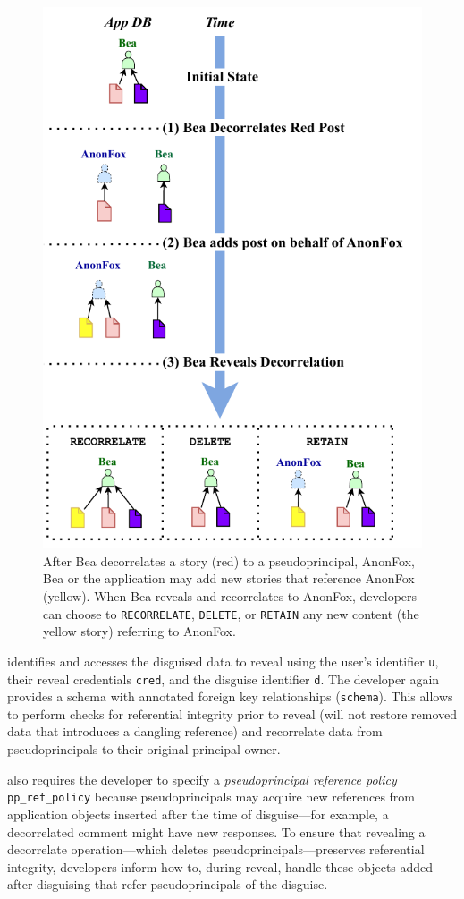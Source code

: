 \begin{figure}
    \centering
    \includegraphics[width=.7\textwidth]{figs/ppreveal_policies}
    \caption[\texttt{RECORRELATE}, \texttt{DELETE}, and
    \texttt{RETAIN} policies maintain referential integrity for objects added
    after disguising that refer to a pseudoprincipal during reveal.]{After Bea
    decorrelates a story (red) to a pseudoprincipal, AnonFox, Bea or the
    application may add new stories that reference AnonFox (yellow). When Bea
    reveals and recorrelates to AnonFox, developers can
    choose to \texttt{RECORRELATE}, \texttt{DELETE}, or \texttt{RETAIN} any new
    content (\ie the yellow story) referring to AnonFox.}
\label{f:ppreveal}
\end{figure}

%
\sys identifies and accesses the disguised data to reveal using the user's
identifier \texttt{u}, their reveal credentials \texttt{cred}, and the disguise
identifier \texttt{d}.  The developer again provides a schema with annotated
foreign key relationships (\texttt{schema}). This allows \sys to perform checks
for referential integrity prior to reveal (\eg \sys will not restore removed
data that introduces a dangling reference) and recorrelate data from
pseudoprincipals to their original principal owner. 
%

\sys also requires the developer to specify a \emph{pseudoprincipal reference policy}
\texttt{pp\_ref\_policy} because pseudoprincipals may acquire new references
from application objects inserted after the time of disguise---for example, a
decorrelated comment might have new responses. To ensure that revealing a
decorrelate operation---which deletes pseudoprincipals---preserves referential
integrity, developers inform \sys how to, during reveal, handle these objects
added after disguising that refer pseudoprincipals of the disguise.
%

